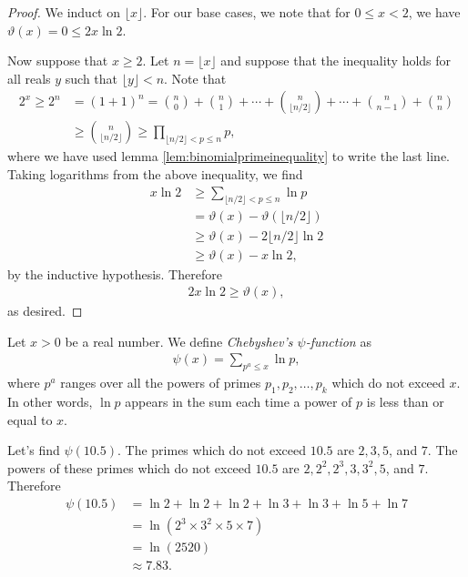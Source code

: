 	\begin{proof}
		We induct on $\lfloor x \rfloor$. For our base cases, we note that for $0 \le x < 2$, we have $\vartheta(x) = 0 \leq 2x \ln 2$.
		
		Now suppose that $x \geq 2$. Let $n = \lfloor x \rfloor$ and suppose that the inequality holds for all reals $y$ such that $\lfloor y \rfloor <n$. Note that
			\begin{align*}
				2^x \geq 2^n &= (1+1)^n = \binom{n}{0} + \binom{n}{1} + \cdots + \binom{n}{\lfloor n/2 \rfloor} + \cdots + \binom{n}{n-1}+\binom{n}{n}\\
					&\geq  \binom{n}{\lfloor n/2 \rfloor} \geq \prod_{\lfloor n/2 \rfloor < p \leq n} p,
			\end{align*} 
		where we have used lemma \eqref{lem:binomialprimeinequality} to write the last line. Taking logarithms from the above inequality, we find
			\begin{align*}
				x \ln 2 &\geq \sum_{\lfloor n/2 \rfloor < p \le n} \ln p \\
						 &= \vartheta(x) - \vartheta(\lfloor n/2 \rfloor) \\
						 &\geq \vartheta(x) - 2\lfloor n/2 \rfloor \ln 2 \\
						 &\geq \vartheta(x) - x \ln 2,
			\end{align*}
		by the inductive hypothesis. Therefore 
			\begin{align*}
				2x \ln 2 \ge \vartheta(x),
			\end{align*}
		as desired.
	\end{proof}
	
	\begin{definition}
		Let $x>0$ be a real number. We define \textit{Chebyshev's $\psi$-function} as
			\begin{align*}
				\psi(x) = \sum_{p^a \leq x} \ln p,
			\end{align*}
		where $p^a$ ranges over all the powers of primes $p_1, p_2, \ldots, p_k$ which do not exceed $x$. In other words, $\ln p$ appears in the sum each time a power of $p$ is less than or equal to $x$.
	\end{definition}
	
	\begin{example}
		Let's find $\psi(10.5)$. The primes which do not exceed $10.5$ are $2,3,5$, and $7$. The powers of these primes which do not exceed $10.5$ are $2, 2^2, 2^3, 3, 3^2, 5$, and $7$. Therefore
			\begin{align*}
				\psi(10.5) &= \ln 2 + \ln 2 + \ln 2 +\ln 3 + \ln 3+ \ln 5 + \ln 7\\
						   &= \ln(2^3 \times  3^2 \times 5 \times 7)\\
						   &=\ln(2520)\\
						   &\approx 7.83.
			\end{align*}
	\end{example}
	
